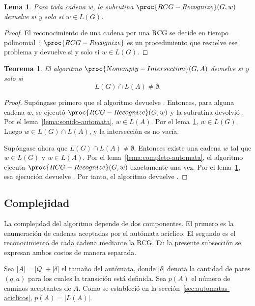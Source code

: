 \documentclass{report}
\theoremstyle{definition}
\theoremstyle{plain}
\newtheorem{teorema}{Teorema}[chapter]
\newtheorem{lema}{Lema}[chapter]
\theoremstyle{remark}
\begin{document}
\begin{lema}
\label{lema:correctitud-reconocedor}
Para toda cadena $w$, la subrutina $\proc{RCG-Recognize}(G,w)$ devuelve
 si y solo si $w \in L(G)$.
\end{lema}

\begin{proof}
El reconocimiento de una cadena por una RCG se decide en tiempo
polinomial~\cite{bertsch2001rcg,kallmeyer2010parsing}; $\proc{RCG-Recognize}$
es un procedimiento que resuelve ese problema y devuelve  si
y solo si $w \in L(G)$.
\end{proof}

\begin{teorema}
\label{teo:correctitud-enumeracion}
El algoritmo $\proc{Nonempty-Intersection}(G,A)$ devuelve
 si y solo si
\[
  L(G) \cap L(A) \neq \emptyset.
\]
\end{teorema}

\begin{proof}
Supóngase primero que el algoritmo devuelve . Entonces, para
alguna cadena $w$, se ejecutó $\proc{RCG-Recognize}(G,w)$ y la subrutina
devolvió . Por el lema~\ref{lema:sonido-automata},
$w \in L(A)$. Por el lema~\ref{lema:correctitud-reconocedor},
$w \in L(G)$. Luego $w \in L(G) \cap L(A)$, y la intersección es no
vacía.

Supóngase ahora que $L(G) \cap L(A) \neq \emptyset$. Entonces existe una
cadena $w$ tal que $w \in L(G)$ y $w \in L(A)$. Por el
lema~\ref{lema:completo-automata}, el algoritmo ejecuta
$\proc{RCG-Recognize}(G,w)$ exactamente una vez. Por el
lema~\ref{lema:correctitud-reconocedor}, esa ejecución devuelve
. Por tanto, el algoritmo devuelve .
\end{proof}

\subsection{Complejidad}
\label{sec:complejidad-algoritmo}

La complejidad del algoritmo depende de dos componentes. El primero es
la enumeración de cadenas aceptadas por el autómata acíclico. El
segundo es el reconocimiento de cada cadena mediante
la RCG. En la presente subsección se expresan ambos costos de manera
separada.

Sea $|A|=|Q|+|\delta|$ el tamaño del autómata, donde $|\delta|$ denota
la cantidad de pares $(q,a)$ para los cuales la transición está definida.
Sea $p(A)$ el número de caminos aceptantes de $A$. Como se estableció
en la sección~\ref{sec:automatas-aciclicos}, $p(A)=|L(A)|$.
\end{document}
